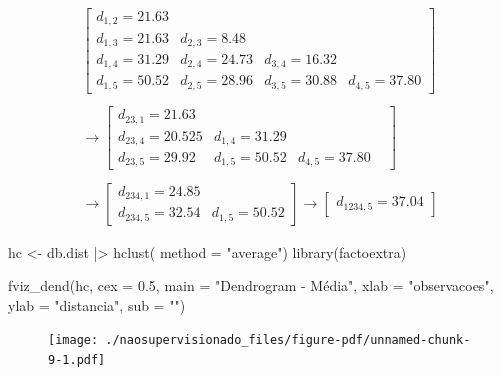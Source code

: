 \documentclass[
  letterpaper,
  DIV=11,
  numbers=noendperiod]{scrreprt}
\newenvironment{Shaded}{\begin{snugshade}}{\end{snugshade}}
\newcommand{\AttributeTok}[1]{\textcolor[rgb]{0.40,0.45,0.13}{#1}}
\newcommand{\FloatTok}[1]{\textcolor[rgb]{0.68,0.00,0.00}{#1}}
\newcommand{\FunctionTok}[1]{\textcolor[rgb]{0.28,0.35,0.67}{#1}}
\newcommand{\NormalTok}[1]{\textcolor[rgb]{0.00,0.23,0.31}{#1}}
\newcommand{\OtherTok}[1]{\textcolor[rgb]{0.00,0.23,0.31}{#1}}
\newcommand{\SpecialCharTok}[1]{\textcolor[rgb]{0.37,0.37,0.37}{#1}}
\newcommand{\StringTok}[1]{\textcolor[rgb]{0.13,0.47,0.30}{#1}}
\begin{document}
\[
\begin{split}
\begin{bmatrix}
d_{1,2}=21.63 &  & & \\
d_{1,3}= 21.63 & d_{2,3}=8.48 & & \\
d_{1,4}=31.29 & d_{2,4}=24.73 & d_{3,4}=16.32 \\
d_{1,5}=50.52 & d_{2,5}=28.96 & d_{3,5}=30.88 & d_{4,5}=37.80
\end{bmatrix}\\
\\\rightarrow
\begin{bmatrix}
d_{23,1}=21.63 &  & & \\
d_{23,4}= 20.525 & d_{1,4}=31.29 & & \\
d_{23,5}=29.92 & d_{1,5}=50.52 & d_{4,5}=37.80 
\end{bmatrix}
\\
\\ \rightarrow
\begin{bmatrix}
d_{234,1}=24.85 \\
d_{234,5}= 32.54 & d_{1,5} = 50.52
\end{bmatrix} \rightarrow
\begin{bmatrix}
d_{1234,5}=37.04
\end{bmatrix}
\end{split}
\]

\begin{Shaded}
\begin{Highlighting}[]
\NormalTok{hc }\OtherTok{\textless{}{-}}\NormalTok{  db.dist }\SpecialCharTok{|\textgreater{}} 
  \FunctionTok{hclust}\NormalTok{( }\AttributeTok{method =} \StringTok{"average"}\NormalTok{) }
\FunctionTok{library}\NormalTok{(factoextra)}

\FunctionTok{fviz\_dend}\NormalTok{(hc, }\AttributeTok{cex =} \FloatTok{0.5}\NormalTok{,}
          \AttributeTok{main =} \StringTok{"Dendrogram {-} Média"}\NormalTok{,}
          \AttributeTok{xlab =} \StringTok{"observacoes"}\NormalTok{, }\AttributeTok{ylab =} \StringTok{"distancia"}\NormalTok{, }\AttributeTok{sub =} \StringTok{""}\NormalTok{)}
\end{Highlighting}
\end{Shaded}

\begin{figure}[H]

{\centering \texttt{[image: ./naosupervisionado\_files/figure-pdf/unnamed-chunk-9-1.pdf]}

}

\end{figure}
\end{document}
